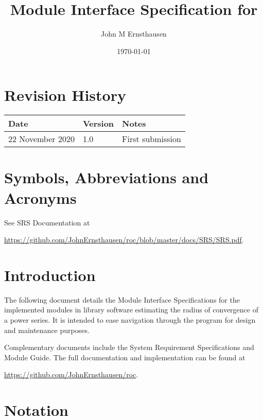 \documentclass[12pt, titlepage]{article}
\begin{document}
\title{Module Interface Specification for }
\author{John M Ernsthausen}
\date{\today}

\maketitle


\section{Revision History}

\begin{tabularx}{\textwidth}{p{3.5cm}p{2cm}X}
\toprule {\bf Date} & {\bf Version} & {\bf Notes}\\
\midrule
  22 November 2020 & 1.0 & First submission\\
\bottomrule
\end{tabularx}

\newpage

\section{Symbols, Abbreviations and Acronyms}

See SRS Documentation at

\noindent \url{https://github.com/JohnErnsthausen/roc/blob/master/docs/SRS/SRS.pdf}.

\newpage

\tableofcontents

\newpage


\section{Introduction}

The following document details the Module Interface Specifications for the implemented
modules in library software  estimating the radius of convergence of a power series.
It is intended to ease navigation through the program for design and maintenance purposes.

Complementary documents include the System Requirement Specifications and Module Guide.
The full documentation and implementation can be found at

\noindent \url{https://github.com/JohnErnsthausen/roc}.

\section{Notation}
\end{document}

